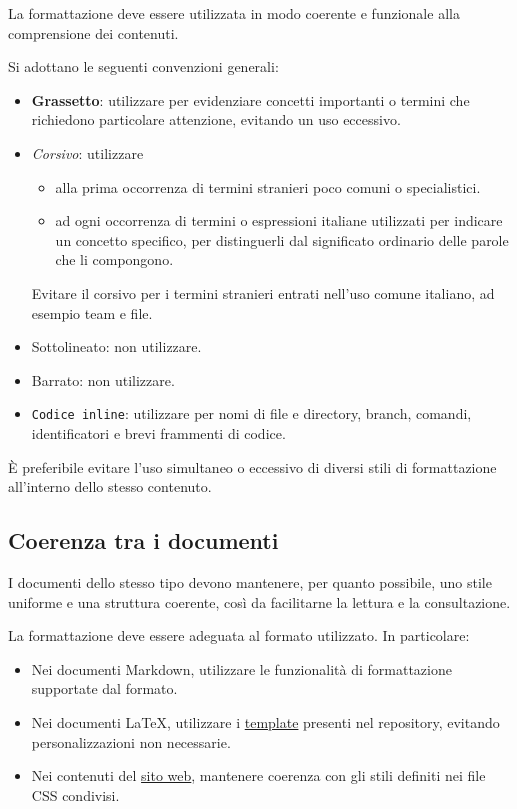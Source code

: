 \documentclass[11pt, a4paper]{article}
\begin{document}
La formattazione deve essere utilizzata in modo coerente e funzionale alla comprensione dei contenuti.

Si adottano le seguenti convenzioni generali:
\begin{itemize}
    \item \textbf{Grassetto}: utilizzare per evidenziare concetti importanti o termini che richiedono particolare attenzione, evitando un uso eccessivo.
    \item \textit{Corsivo}: utilizzare
    \begin{itemize}
        \item alla prima occorrenza di termini stranieri poco comuni o specialistici.
        \item ad ogni occorrenza di termini o espressioni italiane utilizzati per indicare un concetto specifico, per distinguerli dal significato ordinario delle parole che li compongono.
    \end{itemize}

    \noindent Evitare il corsivo per i termini stranieri entrati nell'uso comune italiano, ad esempio team e file.
    \item Sottolineato: non utilizzare.
    \item Barrato: non utilizzare.
    \item \texttt{Codice inline}: utilizzare per nomi di file e directory, branch, comandi, identificatori e brevi frammenti di codice.
\end{itemize}

\noindent È preferibile evitare l'uso simultaneo o eccessivo di diversi stili di formattazione all'interno dello stesso contenuto.

\subsection{Coerenza tra i documenti}

I documenti dello stesso tipo devono mantenere, per quanto possibile, uno stile uniforme e una struttura coerente, così da facilitarne la lettura e la consultazione.

La formattazione deve essere adeguata al formato utilizzato. In particolare:
\begin{itemize}
    \item Nei documenti Markdown, utilizzare le funzionalità di formattazione supportate dal formato.
    \item Nei documenti LaTeX, utilizzare i \href{https://github.com/On-By-One-Team/On-By-One.github.io/tree/main/docs/tex/templates}{template} presenti nel repository, evitando personalizzazioni non necessarie.
    \item Nei contenuti del \href{https://on-by-one-team.github.io/On-By-One.github.io/}{sito web}, mantenere coerenza con gli stili definiti nei file CSS condivisi.
\end{itemize}
\end{document}
